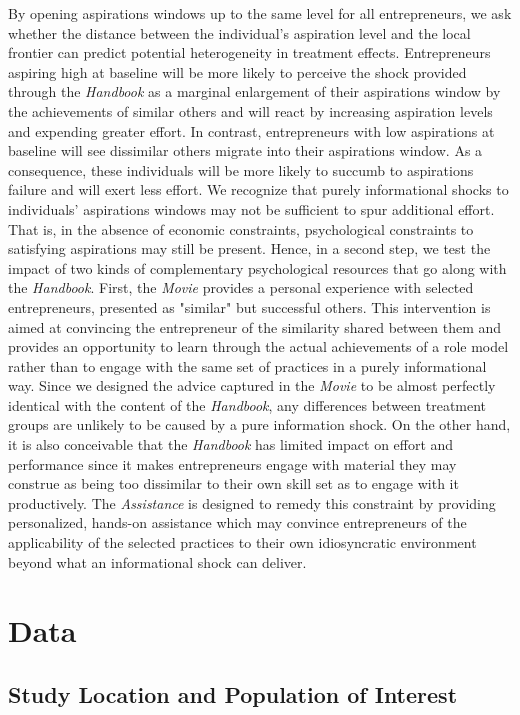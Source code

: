 \documentclass[11.5pt]{article}
\begin{document}
{By opening aspirations windows up to the same level for all entrepreneurs, we ask whether the distance between the individual's aspiration level and the local frontier can predict potential heterogeneity in treatment effects. Entrepreneurs aspiring high at baseline will be more likely to perceive the shock provided through the \emph{Handbook} as a marginal enlargement of their aspirations window by the achievements of similar others and will react by increasing aspiration levels and expending greater effort. In contrast, entrepreneurs with low aspirations at baseline will see dissimilar others migrate into their aspirations window. As a consequence, these individuals will be more likely to succumb to aspirations failure and will exert less effort. We recognize that purely informational shocks to individuals' aspirations windows may not be sufficient to spur additional effort. That is, in the absence of  economic constraints, psychological constraints to satisfying aspirations may still be present. Hence, in a second step, we test the impact of two kinds of complementary psychological resources that go along with the \emph{Handbook}. First, the \emph{Movie} provides a personal experience with selected entrepreneurs, presented as "similar" but successful others. This intervention is aimed at convincing the entrepreneur of the similarity shared between them and provides an opportunity to learn through the actual achievements of a role model rather than to engage with the same set of practices in a purely informational way. Since we designed the advice captured in the \emph{Movie} to be almost perfectly identical with the content of the \emph{Handbook}, any differences between treatment groups are unlikely to be caused by a pure information shock. On the other hand, it is also conceivable that the \emph{Handbook} has limited impact on effort and performance since it makes entrepreneurs engage with material they may construe as being too dissimilar to their own skill set as to engage with it productively. The \emph{Assistance} is designed to remedy this constraint by providing personalized, hands-on assistance which may convince entrepreneurs of the applicability of the selected practices to their own idiosyncratic environment beyond what an informational shock can deliver.

\section{\textbf{Data}}


\subsection{Study Location and Population of Interest}

}
\end{document}
